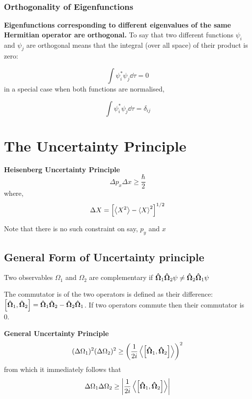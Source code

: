 \documentclass[11pt]{article}
\theoremstyle{definition}
\begin{document}
\subsubsection{Orthogonality of Eigenfunctions}
\textbf{Eigenfunctions corresponding to different eigenvalues of the same Hermitian operator are orthogonal.} To say that two different functions $\psi_i$ and $\psi_j$ are orthogonal means that the integral (over all space) of their product is zero:

\begin{equation*}
    \int \psi_i ^* \psi_j \dd{\tau} = 0
\end{equation*}
in a special case when both functions are normalised,

\begin{equation*}
    \int \psi_i ^* \psi_j \dd{\tau} = \delta_{ij}
\end{equation*}

\section{The Uncertainty Principle}
\begin{shaded}
\textbf{Heisenberg Uncertainty Principle}
\begin{equation*}
    \Delta p_x \Delta x \geq \frac{\hbar}{2}
\end{equation*}
where,
\begin{gather*}
     \Delta X = \left[\expval{X^2} - \expval{X}^2 \right]^{1/2}
\end{gather*}

Note that there is no such constraint on say, $p_y$ and $x$
\end{shaded}

\subsection{General Form of Uncertainty principle}

Two observables $\Omega_1$ and $\Omega_2$ are complementary if $\vectorunit{\Omega}_1 \vectorunit{\Omega}_2 \psi \neq  \vectorunit{\Omega}_2 \vectorunit{\Omega}_1 \psi$

The commutator is of the two operators is defined as their difference: $\comm{\vectorunit{\Omega}_1}{\vectorunit{\Omega}_2} = \vectorunit{\Omega}_1\vectorunit{\Omega}_2 - \vectorunit{\Omega}_2\vectorunit{\Omega}_1$. If two operators commute then their commutator is 0.

\begin{shaded}
\textbf{General Uncertainty Principle}
\begin{equation*}
    (\Delta \Omega_1)^2 (\Delta \Omega_2)^2 \geq \left(\frac{1}{2i}\expval{ \comm{\vectorunit{\Omega}_1}{\vectorunit{\Omega}_2}}\right)^2
\end{equation*}
from which it immediately follows that
\begin{equation*}
    \Delta \Omega_1 \Delta \Omega_2 \geq \abs{\frac{1}{2i} \expval{ \comm{\vectorunit{\Omega}_1}{\vectorunit{\Omega}_2}}}
\end{equation*}
\end{shaded}
\end{document}
